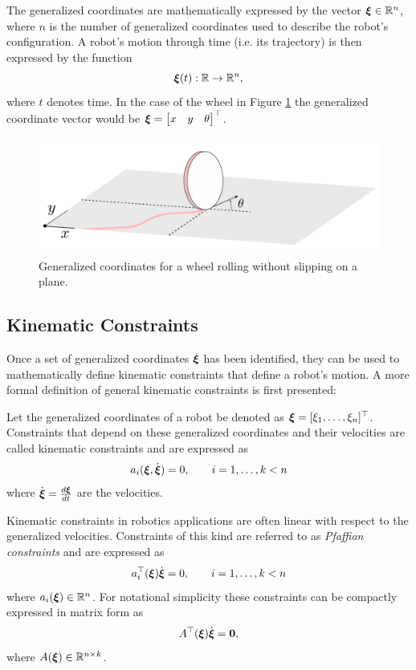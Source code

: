 The generalized coordinates are mathematically expressed by the vector $\bm{\xi} \in \mathbb{R}^n$, where $n$ is the number of generalized coordinates used to describe the robot's configuration.
A robot's motion through time (i.e. its trajectory) is then expressed by the function
\begin{equation*}
    \bm{\xi}(t): \mathbb{R} \to \mathbb{R}^n,
\end{equation*}
where $t$ denotes time. In the case of the wheel in Figure \ref{fig:non slip disk} the generalized coordinate vector would be $\bm{\xi} = \begin{bmatrix} x & y & \theta \end{bmatrix}^\top $.

\begin{figure}[ht] 
    \centering 
    \includegraphics[width=0.65\linewidth]{tex/figs/ch01_figs/wheel_roll.png}
    \caption{Generalized coordinates for a wheel rolling without slipping on a plane.} 
    \label{fig:non slip disk} 
\end{figure} 

\subsection{Kinematic Constraints}
Once a set of generalized coordinates $\bm{\xi}$ has been identified, they can be used to mathematically define kinematic constraints that define a robot's motion. A more formal definition of general kinematic constraints is first presented:

\begin{definition}
Let the generalized coordinates of a robot be denoted as $\bm{\xi} =[\xi_1, \dots, \xi_n]^\top  $. Constraints that depend on these generalized coordinates and their velocities are called kinematic constraints and are expressed as
\begin{equation} \label{eq:kinconst}
    a_i(\bm{\xi}, \dot{\bm{\xi}}) = 0, \quad \quad i = 1, \dots, k < n
\end{equation}
where $\dot{\bm{\xi}} = \frac{d\bm{\xi}}{dt}$ are the velocities.
\end{definition}

Kinematic constraints in robotics applications are often linear with respect to the generalized velocities. Constraints of this kind are referred to as \textit{Pfaffian constraints} and are expressed as
\begin{equation} \label{eq:pfaffian}
    a_i^\top (\bm{\xi})\dot{\bm{\xi}} = 0, \quad \quad i =1, \dots, k < n
\end{equation}
where $a_i(\bm{\xi}) \in \mathbb{R}^n$. For notational simplicity these constraints can be compactly expressed in matrix form as
\begin{equation}
    A^\top (\bm{\xi})\dot{\bm{\xi}}=\bm{0},
\end{equation}
where $A(\bm{\xi}) \in \mathbb{R}^{n \times k}$.


